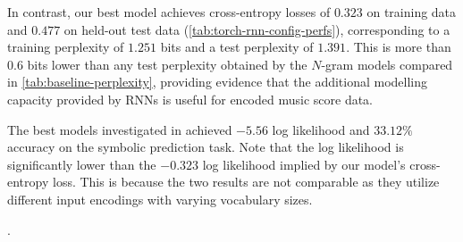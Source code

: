 In contrast, our best model achieves cross-entropy losses of $0.323$ on
training data and $0.477$ on held-out test data
(\vref{tab:torch-rnn-config-perfs}), corresponding to a training perplexity of
$1.251$ bits and a test perplexity of $1.391$. This is more
than $0.6$ bits lower than any test perplexity obtained by the $N$-gram
models compared in \vref{tab:baseline-perplexity}, providing evidence
that the additional modelling capacity provided by RNNs is useful
for encoded music score data.

The best models investigated in \citet{Boulanger-Lewandowski2012} achieved
$-5.56$ log likelihood and $33.12\%$ accuracy on the symbolic prediction task.
Note that the log likelihood is significantly lower than the $-0.323$ log
likelihood implied by our model's cross-entropy loss. This is because the two
results are not comparable as they utilize different input encodings with
varying vocabulary sizes.

.

